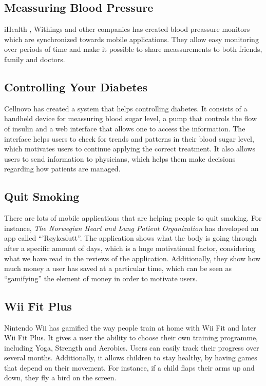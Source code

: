 \subsection{Meassuring Blood Pressure}
iHealth , Withings and other companies has created blood preassure monitors which are synchronized towards mobile applications. They allow easy monitoring over periods of time and make it possible to share meassurements to both friends, family and doctors.


\subsection{Controlling Your Diabetes}
Cellnovo has created a system that helps controlling diabetes. It consists of a handheld device for meassuring blood sugar level, a pump that controls the flow of insulin and a web interface that allows one to access the information. The interface helps users to check for trends and patterns in their blood sugar level, which motivates users to continue applying the correct treatment. It also allows users to send information to physicians, which helps them make decisions regarding how patients are managed.
      


\subsection{Quit Smoking}
There are lots of mobile applications that are helping people to quit smoking. For instance, \emph{The Norwegian Heart and Lung Patient Organization} has developed an app called ``'R\o ykeslutt''. The application shows what the body is going through after a specific amount of days, which is a huge motivational factor, considering what we have read in the reviews of the application. Additionally, they show how much money a user has saved at a particular time, which can be seen as ``gamifying'' the element of money in order to motivate users.  


\subsection{Wii Fit Plus}
Nintendo Wii has gamified the way people train at home with Wii Fit and later Wii Fit Plus. It gives a user the ability to choose their own training programme, including Yoga, Strength and Aerobics. Users can easily track their progress over several months. Additionally, it allows children to stay healthy, by having games that depend on their movement. For instance, if a child flaps their arms up and down, they fly a bird on the screen.    
 